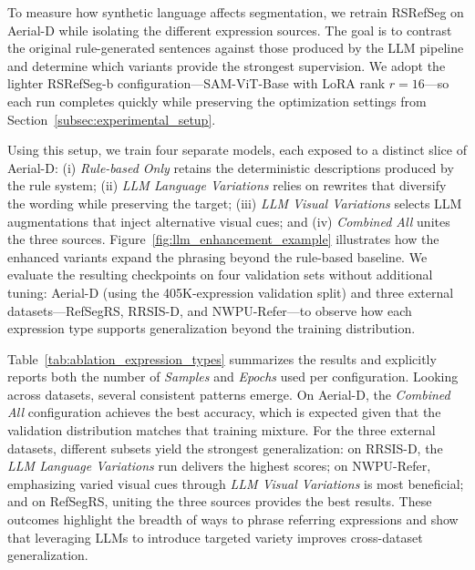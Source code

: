 To measure how synthetic language affects segmentation, we retrain RSRefSeg on Aerial-D while isolating the different expression sources. The goal is to contrast the original rule-generated sentences against those produced by the LLM pipeline and determine which variants provide the strongest supervision. We adopt the lighter RSRefSeg-b configuration—SAM-ViT-Base with LoRA rank \(r=16\)—so each run completes quickly while preserving the optimization settings from Section~\ref{subsec:experimental_setup}.

Using this setup, we train four separate models, each exposed to a distinct slice of Aerial-D: (i) \emph{Rule-based Only} retains the deterministic descriptions produced by the rule system; (ii) \emph{LLM Language Variations} relies on rewrites that diversify the wording while preserving the target; (iii) \emph{LLM Visual Variations} selects LLM augmentations that inject alternative visual cues; and (iv) \emph{Combined All} unites the three sources. Figure~\ref{fig:llm_enhancement_example} illustrates how the enhanced variants expand the phrasing beyond the rule-based baseline. We evaluate the resulting checkpoints on four validation sets without additional tuning: Aerial-D (using the 405K-expression validation split) and three external datasets—RefSegRS, RRSIS-D, and NWPU-Refer—to observe how each expression type supports generalization beyond the training distribution.

Table~\ref{tab:ablation_expression_types} summarizes the results and explicitly reports both the number of \emph{Samples} and \emph{Epochs} used per configuration. Looking across datasets, several consistent patterns emerge. On Aerial-D, the \emph{Combined All} configuration achieves the best accuracy, which is expected given that the validation distribution matches that training mixture. For the three external datasets, different subsets yield the strongest generalization: on RRSIS-D, the \emph{LLM Language Variations} run delivers the highest scores; on NWPU-Refer, emphasizing varied visual cues through \emph{LLM Visual Variations} is most beneficial; and on RefSegRS, uniting the three sources provides the best results. These outcomes highlight the breadth of ways to phrase referring expressions and show that leveraging LLMs to introduce targeted variety improves cross-dataset generalization.

